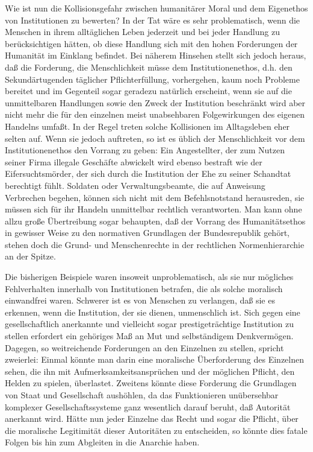 \documentclass[12pt,a4paper]{article}
\begin{document}
Wie ist nun die Kollisionsgefahr zwischen humanitärer Moral und dem Eigenethos
von Institutionen zu bewerten? In der Tat wäre es sehr problematisch, wenn die
Menschen in ihrem alltäglichen Leben jederzeit und bei jeder Handlung zu
berücksichtigen hätten, ob diese Handlung sich mit den hohen Forderungen der
Humanität im Einklang befindet. Bei näherem Hinsehen stellt sich jedoch
heraus, daß die Forderung, die Menschlichkeit müsse dem Institutionenethos,
d.h. den Sekundärtugenden täglicher Pflichterfüllung, vorhergehen, kaum noch
Probleme bereitet und im Gegenteil sogar geradezu natürlich erscheint, wenn
sie auf die unmittelbaren Handlungen sowie den Zweck der Institution
beschränkt wird aber nicht mehr die für den einzelnen meist unabsehbaren
Folgewirkungen des eigenen Handelns umfaßt. In der Regel treten solche
Kollisionen im Alltagsleben eher selten auf. Wenn sie jedoch auftreten, so ist
es üblich der Menschlichkeit vor dem Institutionenethos den Vorrang zu geben:
Ein Angestellter, der zum Nutzen seiner Firma illegale Geschäfte abwickelt
wird ebenso bestraft wie der Eifersuchtsmörder, der sich durch die Institution
der Ehe zu seiner Schandtat berechtigt fühlt.  Soldaten oder
Verwaltungsbeamte, die auf Anweisung Verbrechen begehen, können sich nicht mit
dem Befehlsnotstand herausreden, sie müssen sich für ihr Handeln unmittelbar
rechtlich verantworten. Man kann ohne allzu große Übertreibung sogar
behaupten, daß der Vorrang des Humanitätsethos in gewisser Weise zu den
normativen Grundlagen der Bundesrepublik gehört, stehen doch die Grund- und
Menschenrechte in der rechtlichen Normenhierarchie an der Spitze.

Die bisherigen Beispiele waren insoweit unproblematisch, als sie nur
mögliches Fehlverhalten innerhalb von Institutionen betrafen, die als
solche moralisch einwandfrei waren. Schwerer ist es von Menschen zu
verlangen, daß sie es erkennen, wenn die Institution, der sie dienen,
unmenschlich ist. Sich gegen eine gesellschaftlich anerkannte und
vielleicht sogar prestigeträchtige Institution zu stellen erfordert
ein gehöriges Maß an Mut und selbständigem Denkvermögen. Dagegen, so
weitreichende Forderungen an den Einzelnen zu stellen, spricht
zweierlei: Einmal könnte man darin eine moralische Überforderung des
Einzelnen sehen, die ihn mit Aufmerksamkeitsansprüchen und der
möglichen Pflicht, den Helden zu spielen, überlastet. Zweitens könnte
diese Forderung die Grundlagen von Staat und Gesellschaft aushöhlen,
da das Funktionieren unübersehbar komplexer Gesellschaftssysteme ganz
wesentlich darauf beruht, daß Autorität anerkannt wird. Hätte nun
jeder Einzelne das Recht und sogar die Pflicht, über die moralische
Legitimität dieser Autoritäten zu entscheiden, so könnte dies fatale
Folgen bis hin zum Abgleiten in die Anarchie haben.
\end{document}
